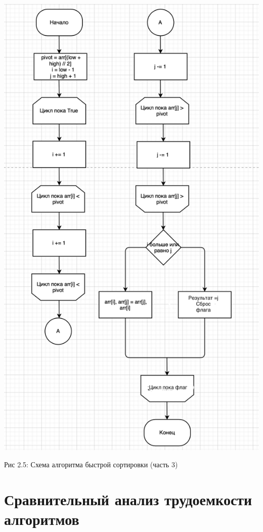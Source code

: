 \documentclass[12pt]{report}
\begin{document}
\begin{center}
		\includegraphics[scale=0.7]{Partition.png}
		
			Рис 2.5: Схема алгоритма быстрой сортировки (часть 3)
\end{center}

\section{Сравнительный анализ трудоемкости алгоритмов}
\end{document}
